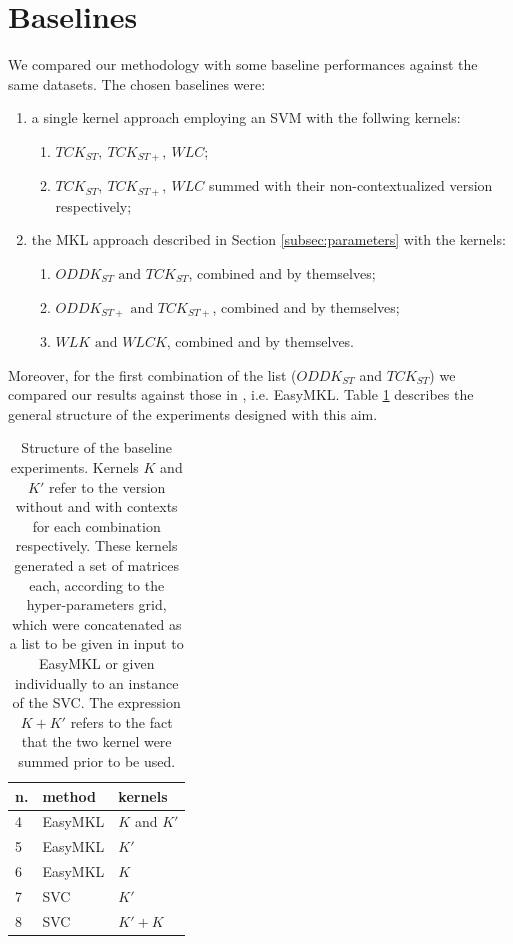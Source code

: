 
\section{Baselines}
We compared our methodology with some baseline performances against the same datasets.
The chosen baselines were:
\begin{enumerate}
    \item a single kernel approach employing an SVM with the follwing kernels:
        \begin{enumerate}
            \item $TCK_{ST},~TCK_{ST+},~WLC$;
            \item $TCK_{ST},~TCK_{ST+},~WLC$ summed with their non-contextualized
                version respectively;
        \end{enumerate}
    \item the MKL approach described in Section \ref{subsec:parameters} with the kernels:
        \begin{enumerate}
            \item $ODDK_{ST}\text{ and }TCK_{ST}$, combined and by themselves;
            \item $ODDK_{ST+}\text{ and }TCK_{ST+}$, combined and by themselves;
            \item $WLK\text{ and }WLCK$, combined and by themselves.
        \end{enumerate}
\end{enumerate}
Moreover, for the first combination of the list ($ODDK_{ST}$ and $TCK_{ST}$)
we compared our results against those in \cite{gmkl}, i.e. EasyMKL.
Table \ref{table:baselines} describes the general structure of the experiments
designed with this aim.

\begin{table}[ht]
    \centering
    \begin{tabular}{|l|l|l|}
        \hline
        n. & method & kernels \\
        \hline
        4 & EasyMKL & $K$ and $K'$ \\
        \hline
        5 & EasyMKL & $K'$ \\
        \hline
        6 & EasyMKL & $K$ \\
        \hline
        7 & SVC & $K'$ \\
        \hline
        8 & SVC & $K'+K$ \\
        \hline
    \end{tabular}
    \caption{Structure of the baseline experiments. Kernels $K$ and $K'$ refer
    to the version without and with contexts for each combination respectively.
    These kernels generated a set of matrices each, according to the hyper-parameters
    grid, which were concatenated as a list to be given in input to EasyMKL or
    given individually to an instance of the SVC. The expression $K + K'$ refers
    to the fact that the two kernel were summed prior to be used.}
    \label{table:baselines}
\end{table}

